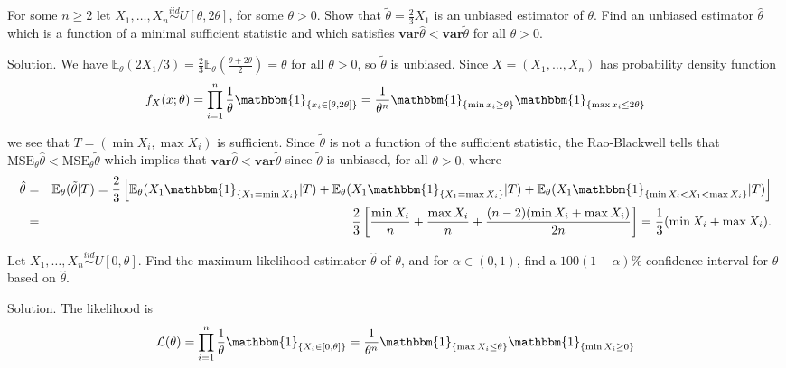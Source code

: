 \item For some $n\geq 2$ let $X_1,\dots,X_n\stackrel{iid}{\sim}U[\theta,2\theta]$, for some $\theta>0$. Show that $\tilde{\theta}=\frac 23 X_1$ is an unbiased estimator of $\theta$. Find an unbiased estimator $\hat{\theta}$ which is a function of a minimal sufficient statistic and which satisfies $\mathbf{var}\hat{\theta}<\mathbf{var}\tilde{\theta}$ for all $\theta>0$.



Solution. We have $\mathbb{E}_\theta(2X_1/3)=\frac 23\mathbb{E}_\theta\left(\frac{\theta+2\theta}{2}\right)=\theta$ for all $\theta>0$, so $\tilde{\theta}$ is unbiased. Since $X=(X_1,\dots,X_n)$ has probability density function
\begin{equation}
f_X(x;\theta)= \prod^n_{i=1}\frac 1\theta \mathbbm{1}_{\{x_i\in[\theta,2\theta]\}} = \frac{1}{\theta^n}\mathbbm{1}_{\{\min x_i\geq \theta\}}\mathbbm{1}_{\{\max x_i\leq 2\theta\}}
\end{equation}

we see that $T=(\min X_i,\max X_i)$ is sufficient. Since $\tilde{\theta}$ is not a function of the sufficient statistic, the Rao-Blackwell tells that $\text{MSE}_\theta \hat{\theta}< \text{MSE}_{\theta} \tilde{\theta}$ which implies that $\mathbf{var}\hat{\theta}<\mathbf{var}\tilde{\theta}$ since $\tilde{\theta}$ is unbiased, for all $\theta>0$, where
\begin{eqnarray}
\hat{\theta} & = & \mathbb{E}_\theta(\tilde{\theta}|T) = \frac 23 \left[\mathbb{E}_\theta(X_1\mathbbm{1}_{\{X_1=\min X_i\}}|T) + \mathbb{E}_\theta(X_1\mathbbm{1}_{\{X_1=\max X_i\}}|T) + \mathbb{E}_\theta(X_1\mathbbm{1}_{\{\min X_i< X_1<\max X_i\}}|T)\right] \nonumber\\
& = & \frac 23 \left[\frac{\min X_i}{n} + \frac{\max X_i}{n} + \frac{(n-2)(\min X_i + \max X_i)}{2n}\right] = \frac 13 (\min X_i +\max X_i).
\end{eqnarray}






\item Let $X_1,\dots,X_n\stackrel{iid}{\sim}U[0,\theta]$. Find the maximum likelihood estimator $\hat{\theta}$ of $\theta$, and for $\alpha\in(0,1)$, find a $100(1-\alpha)\%$ confidence interval for $\theta$ based on $\hat{\theta}$.



Solution. The likelihood is
\begin{equation}
\mathcal{L}(\theta) = \prod^n_{i=1}\frac 1\theta \mathbbm{1}_{\{X_i\in[0,\theta]\}} = \frac{1}{\theta^n}\mathbbm{1}_{\{\max X_i\leq \theta\}}\mathbbm{1}_{\{\min X_i\geq 0\}}
\end{equation}

